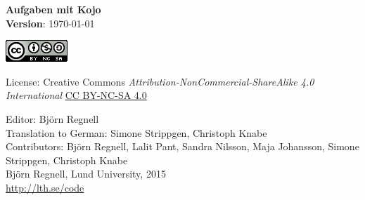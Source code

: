 { \vspace{250mm}\fontsize{11}{11}\flushleft\selectfont 
\vspace*{\fill}

\begin{center}
\Huge {\bf Aufgaben mit Kojo}\\
\Large {\bf Version}: \today{ }
\end{center}
\vskip7cm

\large
\includegraphics{../img/cc.png}

License: Creative Commons {\it Attribution-NonCommercial-ShareAlike 4.0 International} 
\href{http://creativecommons.org/licenses/by-nc-sa/4.0/}{CC BY-NC-SA 4.0}

Editor: Björn Regnell\\
Translation to German: Simone Strippgen, Christoph Knabe\\
Contributors: Björn Regnell, Lalit Pant, Sandra Nilsson, Maja Johansson, Simone Strippgen, Christoph Knabe\\
\textcopyright{ }Björn Regnell, Lund University, 2015 \\
\url{http://lth.se/code}
}